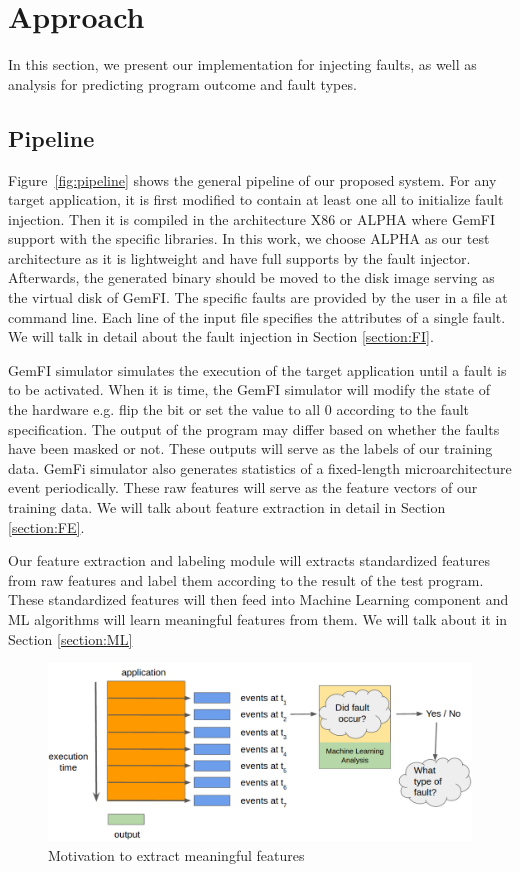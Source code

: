 \section{Approach}
In this section, we present our implementation for injecting faults, as well as analysis for predicting program outcome and fault types.

\subsection{Pipeline}
Figure~\ref{fig:pipeline} shows the general pipeline of our proposed system. For any target application, it is first modified to contain at least one all to initialize fault injection. Then it is compiled in the architecture X86 or ALPHA where GemFI support with the specific libraries. In this work, we choose ALPHA as our test architecture as it is lightweight and have full supports by the fault injector. Afterwards, the generated binary should be moved to the disk image serving as the virtual disk of GemFI. The specific faults are provided by the user in a file at command line. Each line of the input file specifies the attributes of a single fault. We will talk in detail about the fault injection in Section \ref{section:FI}. 

GemFI \cite{parasyris2014gemfi} simulator simulates the execution of the target application until a fault is to be activated. When it is time, the GemFI simulator will modify the state of the hardware e.g. flip the bit or set the value to all 0 according to the fault specification. The output of the program may differ based on whether the faults have been masked or not. These outputs will serve as the labels of our training data. GemFi simulator also generates statistics of a fixed-length microarchitecture event periodically. These raw features will serve as the feature vectors of our training data. We will talk about feature extraction in detail in Section \ref{section:FE}. 

Our feature extraction and labeling module will extracts standardized features from raw features and label them according to the result of the test program. These standardized features will then feed into Machine Learning component and ML algorithms will learn meaningful features from them. We will talk about it in Section \ref{section:ML}

\begin{figure}[t]
\begin{center}
   \includegraphics[width=0.95\linewidth]{./figures/teaser.png}
\end{center}
   \caption{\footnotesize Motivation to extract meaningful features}
\label{fig:teaser}
\end{figure}

